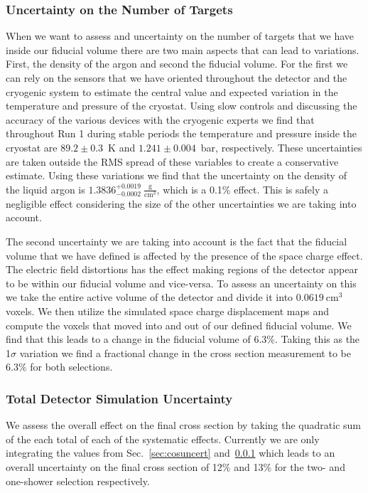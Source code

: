 \subsubsection{Uncertainty on the Number of Targets}\label{sec:ntarguncert}

When we want to assess and uncertainty on the number of targets that we have inside our fiducial volume there are two main aspects that can lead to variations. First, the density of the argon and second the fiducial volume. For the first we can rely on the sensors that we have oriented throughout the detector and the cryogenic system to estimate the central value and expected variation in the temperature and pressure of the cryostat. Using slow controls and discussing the accuracy of the various devices with the cryogenic experts we find that throughout Run 1 during stable periods the temperature and pressure inside the cryostat are $89.2  \pm 0.3$~K and $1.241 \pm 0.004$~bar, respectively. These uncertainties are taken outside the RMS spread of these variables to create a conservative estimate. Using these variations we find that the uncertainty on the density of the liquid argon is $1.3836^{+0.0019}_{-0.0002}~\frac{\text{g}}{\text{cm}^3}$, which is a 0.1\% effect. This is safely a negligible effect considering the size of the other uncertainties we are taking into account.

The second uncertainty we are taking into account is the fact that the fiducial volume that we have defined is affected by the presence of the space charge effect. The electric field distortions has the effect making regions of the detector appear to be within our fiducial volume and vice-versa. To assess an uncertainty on this we take the entire active volume of the detector and divide it into $0.0619~\text{cm}^3$ voxels. We then utilize the simulated space charge displacement maps and compute the voxels that moved into and out of our defined fiducial volume. We find that this leads to a change in the fiducial volume of 6.3\%. Taking this as the 1$\sigma$ variation we find a fractional change in the cross section measurement to be 6.3\% for both selections. 


\subsubsection{Total Detector Simulation Uncertainty}
	
We assess the overall effect on the final cross section by taking the quadratic sum of the each total of each of the systematic effects. Currently we are only integrating the values from Sec.~\ref{sec:cosuncert} and~\ref{sec:ntarguncert} which leads to an overall uncertainty on the final cross section of 12\% and 13\% for the two- and one-shower selection respectively. 

